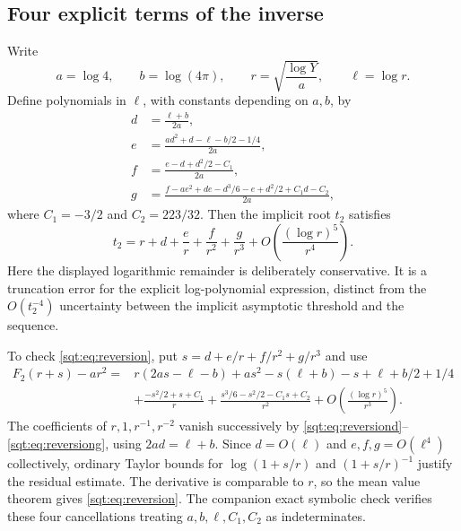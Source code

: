 \subsection{Four explicit terms of the inverse}
Write
\[
a=\log4,\qquad b=\log(4\pi),\qquad
r=\sqrt{\frac{\log Y}{a}},\qquad \ell=\log r.
\]
Define polynomials in $\ell$, with constants depending on $a,b$, by
\begin{align}
d&=\frac{\ell+b}{2a},\label{sqt:eq:reversiond}\\
e&=\frac{ad^2+d-\ell-b/2-1/4}{2a},\label{sqt:eq:reversione}\\
f&=\frac{e-d+d^2/2-C_1}{2a},\label{sqt:eq:reversionf}\\
g&=\frac{f-ae^2+de-d^3/6-e+d^2/2+C_1d-C_2}{2a},\label{sqt:eq:reversiong}
\end{align}
where $C_1=-3/2$ and $C_2=223/32$. Then the implicit root $t_2$ satisfies
\begin{equation}\label{sqt:eq:reversion}
t_2=r+d+\frac e r+\frac f{r^2}+\frac g{r^3}
       +O\left(\frac{(\log r)^5}{r^4}\right).
\end{equation}
Here the displayed logarithmic remainder is deliberately conservative. It is a truncation error for the explicit log-polynomial expression, distinct from the $O(t_2^{-4})$ uncertainty between the implicit asymptotic threshold and the sequence.

To check \eqref{sqt:eq:reversion}, put $s=d+e/r+f/r^2+g/r^3$ and use
\begin{align*}
F_2(r+s)-ar^2={}&r(2as-\ell-b)
 +as^2-s(\ell+b)-s+\ell+b/2+1/4\\
&+\frac{-s^2/2+s+C_1}{r}
 +\frac{s^3/6-s^2/2-C_1s+C_2}{r^2}
 +O\left(\frac{(\log r)^5}{r^3}\right).
\end{align*}
The coefficients of $r,1,r^{-1},r^{-2}$ vanish successively by \eqref{sqt:eq:reversiond}--\eqref{sqt:eq:reversiong}, using $2ad=\ell+b$. Since $d=O(\ell)$ and $e,f,g=O(\ell^4)$ collectively, ordinary Taylor bounds for $\log(1+s/r)$ and $(1+s/r)^{-1}$ justify the residual estimate. The derivative is comparable to $r$, so the mean value theorem gives \eqref{sqt:eq:reversion}. The companion exact symbolic check verifies these four cancellations treating $a,b,\ell,C_1,C_2$ as indeterminates.

